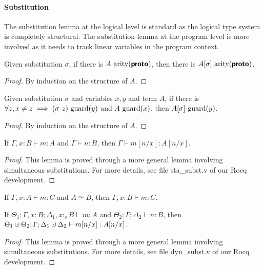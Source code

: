 \paragraph{\textbf{Substitution}}
The substitution lemma at the logical level is standard as the logical type system is
completely structural. The substitution lemma at the program level is more involved
as it needs to track linear variables in the program context.

\begin{lemma}
  Given substitution $\sigma$, if there is $A~\text{arity}(\textbf{\textsf{proto}})$, then there is $A[\sigma]~\text{arity}(\textbf{\textsf{proto}})$.
\end{lemma}
\begin{proof}
  By induction on the structure of $A$.
\end{proof}

\begin{lemma}
  Given substitution $\sigma$ and variables $x, y$ and term $A$,
  if there is $\forall z, x \neq z \implies (\sigma\ z)~\text{guard}(y)$
  and $A~\text{guard}(x)$, then $A[\sigma]~\text{guard}(y)$.
\end{lemma}
\begin{proof}
  By induction on the structure of $A$.
\end{proof}

\begin{lemma}
  If $\Gamma, x : B \vdash m : A$ and $\Gamma \vdash n : B$, then $\Gamma \vdash m[n/x] : A[n/x]$.
\end{lemma}
\begin{proof}
  This lemma is proved through a more general lemma involving simultaneous substitutions. 
  For more details, see file \textsf{sta\_subst.v} of our Rocq development.
\end{proof}

\begin{corollary}
  If $\Gamma, x : A \vdash m : C$ and $A \simeq B$, then $\Gamma, x : B \vdash m : C$.
\end{corollary}

\begin{lemma}
  If ${\Theta_1 ; \Gamma, x : B ; \Delta_1, x :_s B \vdash m : A}$ and
  ${\Theta_2 ; \Gamma ; \Delta_2 \vdash n : B}$, then
  ${\Theta_1 \dotcup \Theta_2 ; \Gamma ; \Delta_1 \dotcup \Delta_2 \vdash m[n/x] : A[n/x]}$.
\end{lemma}
\begin{proof}
  This lemma is proved through a more general lemma involving simultaneous substitutions. 
  For more details, see file \textsf{dyn\_subst.v} of our Rocq development.
\end{proof}

